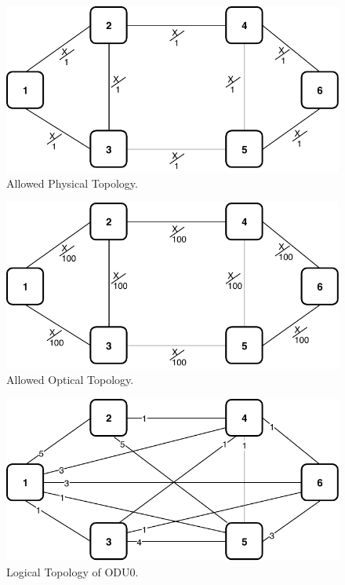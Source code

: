 \begin{figure}[h!]
\centering
\includegraphics[width=12cm]{sdf/ilp/opaque_survivability/figures/allowed_physical_topology}
\caption{Allowed Physical Topology.}
\label{allowed_physical_low}
\end{figure}

\begin{figure}[h!]
\centering
\includegraphics[width=12cm]{sdf/ilp/opaque_survivability/figures/allowed_optical_topology}
\caption{Allowed Optical Topology.}
\label{allowed_optical_low}
\end{figure}

\begin{figure}[h!]
\centering
\includegraphics[width=12cm]{sdf/ilp/opaque_survivability/figures/logical_topology_ODU0_low}
\caption{Logical Topology of ODU0.}
\label{logical_ODU0_low}
\end{figure}

